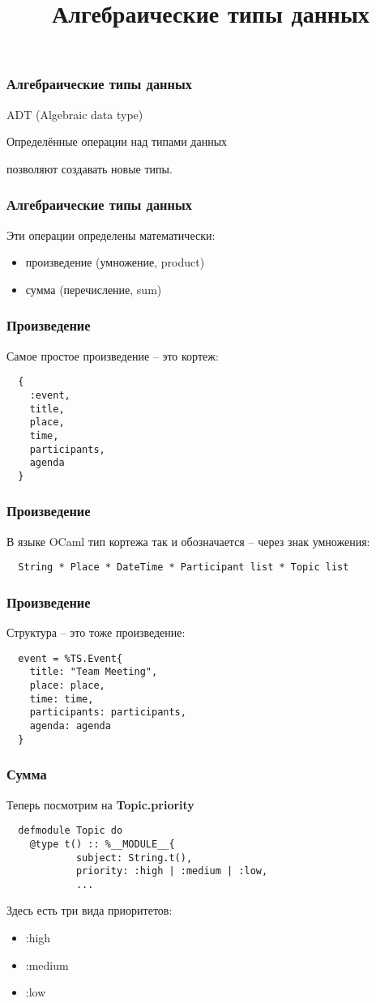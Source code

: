 \documentclass[10pt]{beamer}
\title{Алгебраические типы данных}
\begin{document}
\begin{frame}
  \frametitle{Алгебраические типы данных}
  ADT (Algebraic data type)
  \par \bigskip
  Определённые операции над типами данных
  \par \bigskip
  позволяют создавать новые типы.
\end{frame}

\begin{frame}
  \frametitle{Алгебраические типы данных}
  Эти операции определены математически:
  \par \bigskip
  \begin{itemize}
  \item произведение (умножение, product)
  \item сумма (перечисление, sum)
  \end{itemize}
\end{frame}

\begin{frame}[fragile]
  \frametitle{Произведение}
  Самое простое произведение -- это кортеж:
  \par \bigskip
  \begin{lstlisting}
  {
    :event,
    title,
    place,
    time,
    participants,
    agenda
  }
  \end{lstlisting}
\end{frame}

\begin{frame}[fragile]
  \frametitle{Произведение}
  В языке OCaml тип кортежа так и обозначается -- через знак умножения:
  \par \bigskip
  \begin{lstlisting}
  String * Place * DateTime * Participant list * Topic list
  \end{lstlisting}
\end{frame}

\begin{frame}[fragile]
  \frametitle{Произведение}
  Структура -- это тоже произведение:
  \par \bigskip
  \begin{lstlisting}
  event = %TS.Event{
    title: "Team Meeting",
    place: place,
    time: time,
    participants: participants,
    agenda: agenda
  }
  \end{lstlisting}
\end{frame}

\begin{frame}[fragile]
  \frametitle{Сумма}
  Теперь посмотрим на \textbf{Topic.priority}
  \par \bigskip
  \begin{lstlisting}
  defmodule Topic do
    @type t() :: %__MODULE__{
            subject: String.t(),
            priority: :high | :medium | :low,
            ...
  \end{lstlisting}
  \par \bigskip
  Здесь есть три вида приоритетов:
  \begin{itemize}
  \item :high
  \item :medium
  \item :low
  \end{itemize}
\end{frame}
\end{document}
